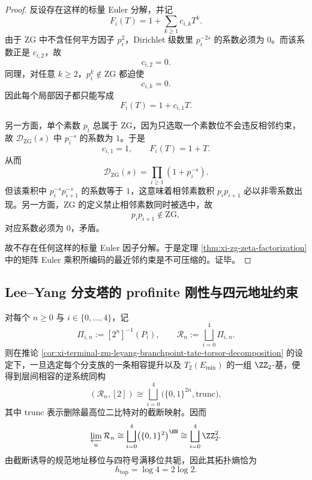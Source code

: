 \documentclass[../../../main.tex]{subfiles}
\begin{document}
\begin{proof}
反设存在这样的标量 Euler 分解，并记
\[
F_i(T)=1+\sum_{k\ge 1}c_{i,k}T^k.
\]
由于 \(\mathrm{ZG}\) 中不含任何平方因子 \(p_i^2\)，Dirichlet 级数里 \(p_i^{-2s}\) 的系数必须为 \(0\)。而该系数正是 \(c_{i,2}\)，故
\[
c_{i,2}=0.
\]
同理，对任意 \(k\ge 2\)，\(p_i^k\notin \mathrm{ZG}\) 都迫使
\[
c_{i,k}=0.
\]
因此每个局部因子都只能写成
\[
F_i(T)=1+c_{i,1}T.
\]

另一方面，单个素数 \(p_i\) 总属于 \(\mathrm{ZG}\)，因为只选取一个素数位不会违反相邻约束，故 \(\mathcal D_{\mathrm{ZG}}(s)\) 中 \(p_i^{-s}\) 的系数为 \(1\)。于是
\[
c_{i,1}=1,
\qquad
F_i(T)=1+T.
\]
从而
\[
\mathcal D_{\mathrm{ZG}}(s)=\prod_{i\ge 1}(1+p_i^{-s}).
\]
但该乘积中 \(p_i^{-s}p_{i+1}^{-s}\) 的系数等于 \(1\)，这意味着相邻素数积 \(p_ip_{i+1}\) 必以非零系数出现。另一方面，\(\mathrm{ZG}\) 的定义禁止相邻素数同时被选中，故
\[
p_ip_{i+1}\notin \mathrm{ZG},
\]
对应系数必须为 \(0\)，矛盾。

故不存在任何这样的标量 Euler 因子分解。于是定理 \ref{thm:xi-zg-zeta-factorization} 中的矩阵 Euler 乘积所编码的最近邻约束是不可压缩的。证毕。
\end{proof}

\subsection{Lee--Yang 分支塔的 profinite 刚性与四元地址约束}

\begin{theorem}\label{thm:derived-leyang-profinite-rigidity}
对每个 \(n\ge 0\) 与 \(i\in\{0,\dots,4\}\)，记
\[
\Pi_{i,n}:=[2^n]^{-1}(P_i),
\qquad
\mathcal R_n:=\bigsqcup_{i=0}^{4}\Pi_{i,n}.
\]
则在推论 \ref{cor:xi-terminal-zm-leyang-branchpoint-tate-torsor-decomposition} 的设定下，一旦选定每个分支族的一条相容提升以及 \(T_2(E_{\min})\) 的一组 \(\ZZ_2\)-基，便得到层间相容的逆系统同构
\[
(\mathcal R_n,[2])
\cong
\bigsqcup_{i=0}^{4}\bigl(\{0,1\}^{2n},\mathrm{trunc}\bigr),
\]
其中 \(\mathrm{trunc}\) 表示删除最高位二比特对的截断映射。因而
\[
\varprojlim_n \mathcal R_n
\cong
\bigsqcup_{i=0}^{4}\bigl(\{0,1\}^{2}\bigr)^{\NN}
\cong
\bigsqcup_{i=0}^{4}\ZZ_2^2.
\]
由截断诱导的规范地址移位与四符号满移位共轭，因此其拓扑熵恰为
\[
h_{\mathrm{top}}=\log 4=2\log 2.
\]
\end{theorem}
\end{document}
